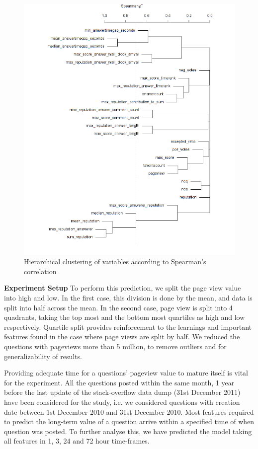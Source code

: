 \begin{figure}[!t]
    \centering
    \includegraphics[width=\columnwidth]{img/Spearman.pdf}
    \caption{Hierarchical clustering of variables according to Spearman’s correlation}
    \label{fig:spearman}
\end{figure}


\textbf{Experiment Setup} To perform this prediction, we split the page view value into high and low. In the first case, this division is done by the mean, and data is split into half across the mean. In the second case, page view is split into 4 quadrants, taking the top most and the bottom most quartiles as high and low respectively. Quartile split provides reinforcement to the learnings and important features found in the case where page views are split by half. We reduced the questions with pageviews more than 5 million, to remove outliers and for generalizability of results.

Providing adequate time for a questions’ pageview value to mature itself is vital for the experiment. All the questions posted within the same month, 1 year before the last update of the stack-overflow data dump (31st December 2011) have been considered for the study, i.e. we considered questions with creation date between 1st December 2010 and 31st December 2010.  Most features required to predict the long-term value of a question arrive within a specified time of when question was posted. To further analyse this, we have predicted the model taking all features in 1, 3, 24 and 72 hour time-frames.

